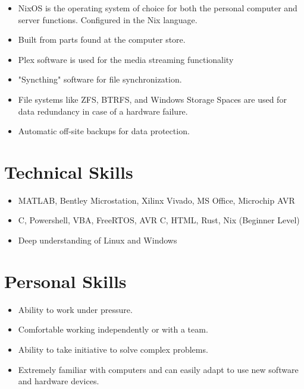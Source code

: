 \documentclass{lsanche_cv}
\begin{document}
\begin{multicols*}{2}
    \divider

      \begin{itemize}
        \item NixOS is the operating system of choice for both the personal computer and server functions. Configured in the Nix language.
        \item Built from parts found at the computer store.
        \item Plex software is used for the media streaming functionality
        \item "Syncthing" software for file synchronization.
        \item File systems like ZFS, BTRFS, and Windows Storage Spaces are used for data redundancy in case of a hardware failure.
				\item Automatic off-site backups for data protection.
      \end{itemize}

    \section{Technical Skills}
      \begin{itemize}
        \item MATLAB, Bentley Microstation, Xilinx Vivado, MS Office, Microchip AVR
        \item C, Powershell, VBA, FreeRTOS, AVR C, HTML, Rust, Nix (Beginner Level)
        \item Deep understanding of Linux and Windows
      \end{itemize}
    
    \section{Personal Skills}
      \begin{itemize}
        \item Ability to work under pressure.
        \item Comfortable working independently or with a team.
        \item Ability to take initiative to solve complex problems.
        \item Extremely familiar with computers and can easily adapt to use new software and hardware devices.
      \end{itemize}
\end{multicols*}
\end{document}
